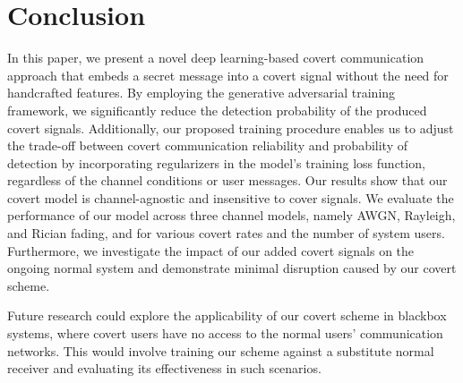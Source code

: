 \section{Conclusion}
\label{s:conc}
In this paper, we present a novel deep learning-based covert communication approach that embeds a secret message into a covert signal without the need for handcrafted features. By employing the generative adversarial training framework, we significantly reduce the detection probability of the produced covert signals. Additionally, our proposed training procedure enables us to adjust the trade-off between covert communication reliability and probability of detection by incorporating regularizers in the model's training loss function, regardless of the channel conditions or user messages. Our results show that our covert model is channel-agnostic and insensitive to cover signals. We evaluate the performance of our model across three channel models, namely AWGN, Rayleigh, and Rician fading, and for various covert rates and the number of system users. Furthermore, we investigate the impact of our added covert signals on the ongoing normal system and demonstrate minimal disruption caused by our covert scheme.

Future research could explore the applicability of our covert scheme in blackbox systems, where covert users have no access to the normal users' communication networks. This would involve training our scheme against a substitute normal receiver and evaluating its effectiveness in such scenarios.